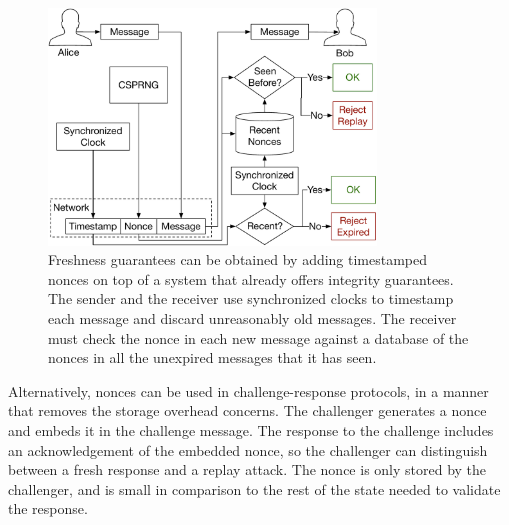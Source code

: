 \begin{figure}[hbt]
  \centering
  \includegraphics[width=87mm]{figures/timestamped_nonces.pdf}
  \caption{
    Freshness guarantees can be obtained by adding timestamped nonces on top
    of a system that already offers integrity guarantees. The sender and the
    receiver use synchronized clocks to timestamp each message and discard
    unreasonably old messages. The receiver must check the nonce in each new
    message against a database of the nonces in all the unexpired messages that
    it has seen.
  }
  \label{fig:timestamped_nonces}
\end{figure}

Alternatively, nonces can be used in challenge-response protocols, in a manner
that removes the storage overhead concerns. The challenger generates a nonce
and embeds it in the challenge message. The response to the challenge includes
an acknowledgement of the embedded nonce, so the challenger can distinguish
between a fresh response and a replay attack. The nonce is only stored by the
challenger, and is small in comparison to the rest of the state needed to
validate the response.
